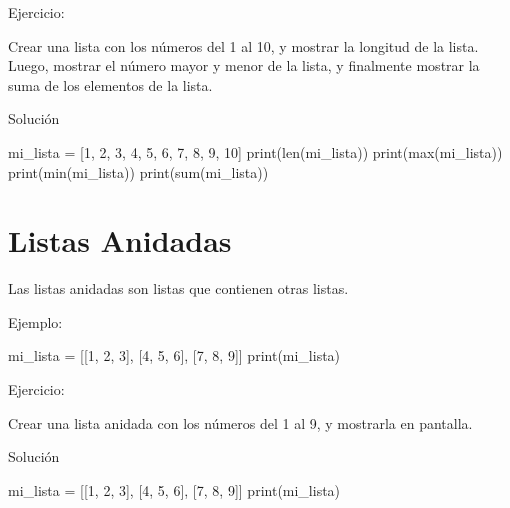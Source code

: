 \documentclass[
  a4paper,
  DIV=11,
  numbers=noendperiod,
  onepage,
  openany]{scrreprt}
\newenvironment{Shaded}{\begin{snugshade}}{\end{snugshade}}
\newcommand{\BuiltInTok}[1]{\textcolor[rgb]{0.00,0.23,0.31}{#1}}
\newcommand{\DecValTok}[1]{\textcolor[rgb]{0.68,0.00,0.00}{#1}}
\newcommand{\NormalTok}[1]{\textcolor[rgb]{0.00,0.23,0.31}{#1}}
\newcommand{\OperatorTok}[1]{\textcolor[rgb]{0.37,0.37,0.37}{#1}}
\begin{document}
Ejercicio:

Crear una lista con los números del 1 al 10, y mostrar la longitud de la
lista. Luego, mostrar el número mayor y menor de la lista, y finalmente
mostrar la suma de los elementos de la lista.

Solución

\begin{Shaded}
\begin{Highlighting}[]
\NormalTok{  mi\_lista }\OperatorTok{=}\NormalTok{ [}\DecValTok{1}\NormalTok{, }\DecValTok{2}\NormalTok{, }\DecValTok{3}\NormalTok{, }\DecValTok{4}\NormalTok{, }\DecValTok{5}\NormalTok{, }\DecValTok{6}\NormalTok{, }\DecValTok{7}\NormalTok{, }\DecValTok{8}\NormalTok{, }\DecValTok{9}\NormalTok{, }\DecValTok{10}\NormalTok{]}
  \BuiltInTok{print}\NormalTok{(}\BuiltInTok{len}\NormalTok{(mi\_lista))}
  \BuiltInTok{print}\NormalTok{(}\BuiltInTok{max}\NormalTok{(mi\_lista))}
  \BuiltInTok{print}\NormalTok{(}\BuiltInTok{min}\NormalTok{(mi\_lista))}
  \BuiltInTok{print}\NormalTok{(}\BuiltInTok{sum}\NormalTok{(mi\_lista))}
\end{Highlighting}
\end{Shaded}

\chapter{Listas Anidadas}\label{listas-anidadas}

Las listas anidadas son listas que contienen otras listas.

Ejemplo:

\begin{Shaded}
\begin{Highlighting}[]
\NormalTok{mi\_lista }\OperatorTok{=}\NormalTok{ [[}\DecValTok{1}\NormalTok{, }\DecValTok{2}\NormalTok{, }\DecValTok{3}\NormalTok{], [}\DecValTok{4}\NormalTok{, }\DecValTok{5}\NormalTok{, }\DecValTok{6}\NormalTok{], [}\DecValTok{7}\NormalTok{, }\DecValTok{8}\NormalTok{, }\DecValTok{9}\NormalTok{]]}
\BuiltInTok{print}\NormalTok{(mi\_lista)}
\end{Highlighting}
\end{Shaded}

Ejercicio:

Crear una lista anidada con los números del 1 al 9, y mostrarla en
pantalla.

Solución

\begin{Shaded}
\begin{Highlighting}[]
\NormalTok{  mi\_lista }\OperatorTok{=}\NormalTok{ [[}\DecValTok{1}\NormalTok{, }\DecValTok{2}\NormalTok{, }\DecValTok{3}\NormalTok{], [}\DecValTok{4}\NormalTok{, }\DecValTok{5}\NormalTok{, }\DecValTok{6}\NormalTok{], [}\DecValTok{7}\NormalTok{, }\DecValTok{8}\NormalTok{, }\DecValTok{9}\NormalTok{]]}
  \BuiltInTok{print}\NormalTok{(mi\_lista)}
\end{Highlighting}
\end{Shaded}
\end{document}
